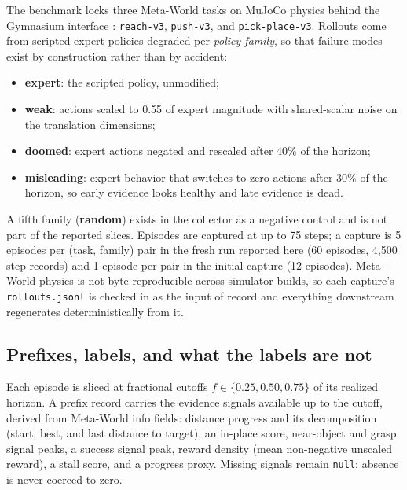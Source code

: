 \documentclass[11pt]{article}
\begin{document}
The benchmark locks three Meta-World tasks \citep{yu2020metaworld} on MuJoCo physics
\citep{todorov2012mujoco} behind the Gymnasium interface \citep{towers2024gymnasium}:
\texttt{reach-v3}, \texttt{push-v3}, and \texttt{pick-place-v3}. Rollouts come from scripted
expert policies degraded per \emph{policy family}, so that failure modes exist by
construction rather than by accident:

\begin{itemize}
  \item \textbf{expert}: the scripted policy, unmodified;
  \item \textbf{weak}: actions scaled to 0.55 of expert magnitude with shared-scalar noise on
  the translation dimensions;
  \item \textbf{doomed}: expert actions negated and rescaled after 40\% of the horizon;
  \item \textbf{misleading}: expert behavior that switches to zero actions after 30\% of the
  horizon, so early evidence looks healthy and late evidence is dead.
\end{itemize}

A fifth family (\textbf{random}) exists in the collector as a negative control and is not
part of the reported slices. Episodes are captured at up to 75 steps; a capture is 5 episodes
per (task, family) pair in the fresh run reported here (60 episodes, 4{,}500 step records) and
1 episode per pair in the initial capture (12 episodes). Meta-World physics is not
byte-reproducible across simulator builds, so each capture's \texttt{rollouts.jsonl} is
checked in as the input of record and everything downstream regenerates deterministically
from it.

\subsection{Prefixes, labels, and what the labels are not}
\label{sec:labels}

Each episode is sliced at fractional cutoffs $f \in \{0.25, 0.50, 0.75\}$ of its realized
horizon. A prefix record carries the evidence signals available up to the cutoff, derived
from Meta-World info fields: distance progress and its decomposition (start, best, and last
distance to target), an in-place score, near-object and grasp signal peaks, a success signal
peak, reward density (mean non-negative unscaled reward), a stall score, and a progress
proxy. Missing signals remain \texttt{null}; absence is never coerced to zero.
\end{document}
